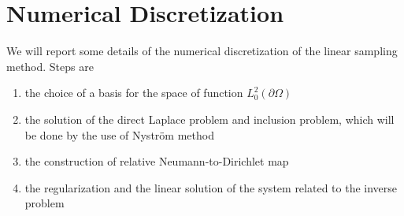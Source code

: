 \documentclass[10pt, a4paper, twoside, openright]{book}
\theoremstyle{definition}
\theoremstyle{plain}
\theoremstyle{plain}
\theoremstyle{plain}
\theoremstyle{plain}
\theoremstyle{plain}
\theoremstyle{plain}
\theoremstyle{plain}
\theoremstyle{plain}
\begin{document}
\section{Numerical Discretization}
We will report some details of the numerical discretization of the linear sampling method. Steps are
\begin{enumerate}
 \item the choice of a basis for the space of function $L^2_0(\partial \Omega)$
 \item the solution of the direct Laplace problem and inclusion problem, which will be done by the use of Nystr\"om method
 \item the construction of relative Neumann-to-Dirichlet map
 \item the regularization and the linear solution of the system related to the inverse problem
\end{enumerate}
\end{document}
